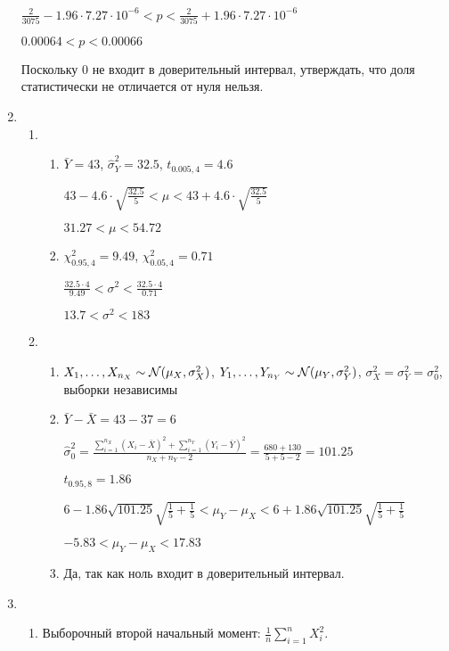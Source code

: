 \begin{enumerate}
$\frac{2}{3075} - 1.96 \cdot 7.27 \cdot 10^{-6} < p < \frac{2}{3075} + 1.96 \cdot 7.27 \cdot 10^{-6}$

$0.00064 < p < 0.00066$

Поскольку $0$ не входит в доверительный интервал, утверждать, что доля статистически
не отличается от нуля нельзя.

\item
\begin{enumerate}
  \item
  \begin{enumerate}
    \item $\bar{Y} = 43$, $\hat{\sigma}_Y^2 = 32.5$, $t_{0.005, 4} = 4.6$

    $43 - 4.6 \cdot \sqrt{\frac{32.5}{5}} < \mu < 43 + 4.6 \cdot \sqrt{\frac{32.5}{5}}$

    $31.27 < \mu < 54.72$

    \item $\chi^2_{0.95, 4} = 9.49$, $\chi^2_{0.05, 4} = 0.71$

    $\frac{32.5 \cdot 4}{9.49} < \sigma^2 < \frac{32.5 \cdot 4}{0.71}$

    $13.7 < \sigma^2 < 183$
  \end{enumerate}
  \item
  \begin{enumerate}
  \item
  $X_1, \ldots, X_{n_X} \sim \mathcal{N}(\mu_X, \sigma^2_X)$, $Y_1, \ldots, Y_{n_Y} \sim \mathcal{N}(\mu_Y, \sigma^2_Y)$,
  $\sigma^2_X = \sigma^2_Y = \sigma^2_0$, выборки независимы

  \item $\bar{Y} - \bar{X} = 43 - 37 = 6$

  $\hat{\sigma}^2_0 = \frac{\sum_{i=1}^{n_X} (X_i - \bar X)^2 + \sum_{i=1}^{n_Y} (Y_i - \bar Y)^2}{n_X + n_Y - 2} = \frac{680+130}{5+5-2} = 101.25$

  $t_{0.95, 8} = 1.86$

  $6 - 1.86 \sqrt{101.25} \sqrt{\frac{1}{5} + \frac{1}{5}} < \mu_Y - \mu_X <  6 + 1.86 \sqrt{101.25} \sqrt{\frac{1}{5} + \frac{1}{5}} $

  $-5.83 < \mu_Y - \mu_X < 17.83$
  \item Да, так как ноль входит в доверительный интервал.
  \end{enumerate}
\end{enumerate}
\item
\begin{enumerate}
  \item Выборочный второй начальный момент: $\frac{1}{n} \sum_{i=1}^n X_i^2$.


\end{enumerate}
\end{enumerate}
